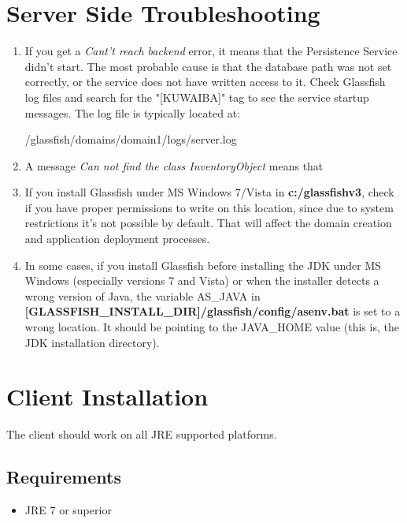 \documentclass[a4paper]{article}
\begin{document}
			\newpage
			\section{Server Side Troubleshooting} \label{sec:Troubleshooting}
				\begin{enumerate}
					\item If you get a \textit{Cant't reach backend} error, it means that the Persistence Service didn't start. The most probable cause is that the database path was not set correctly, or the service does not have written access to it. Check Glassfish log files and search for the "[KUWAIBA]" tag to see the service startup messages. The log file is typically located at:
					\begin{verbbox}
						/glassfish/domains/domain1/logs/server.log
					\end{verbbox}
					\begin{figure}[h!]
						\centering	
						\theverbbox
					\end{figure}					
					\item A message \textit{Can not find the class InventoryObject} means that 
					\item If you install Glassfish under MS Windows 7/Vista in \textbf{c:/glassfishv3}, check if you have proper permissions to write on this location, since due to system restrictions it's not possible by default. That will affect the domain creation and application deployment processes.
					\item In some cases, if you install Glassfish before installing the JDK under MS Windows (especially versions 7 and Vista) or when the installer detects a wrong version of Java, the variable AS\_JAVA in \textbf{[GLASSFISH\_INSTALL\_DIR]/glassfish/config/asenv.bat} is set to a wrong location. It should be pointing to the JAVA\_HOME value (this is, the JDK installation directory).
				\end{enumerate}
			\newpage
			\section{Client Installation}
				The client should work on all JRE supported platforms.
				\subsection{Requirements}
					\begin{itemize}
						\item JRE 7 or superior
					\end{itemize}
			
\end{document}
